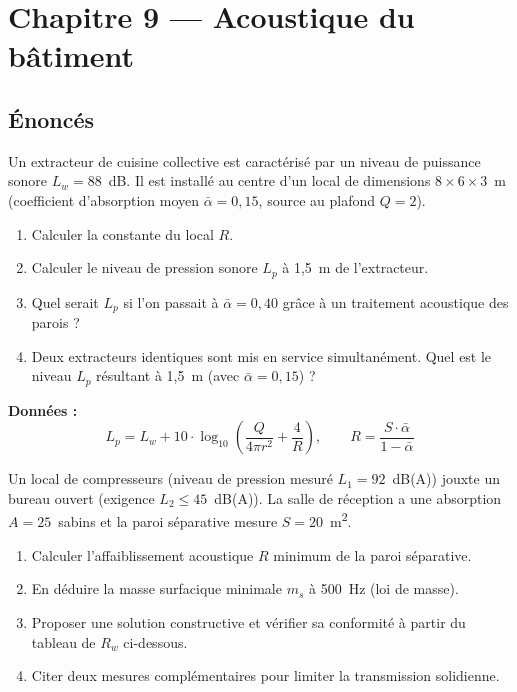 \chapter*{Chapitre 9 — Acoustique du bâtiment}

\section*{Énoncés}


Un extracteur de cuisine collective est caractérisé par un niveau de puissance sonore $L_w = 88$~dB. Il est installé au centre d'un local de dimensions $8 \times 6 \times 3$~m (coefficient d'absorption moyen $\bar{\alpha} = 0{,}15$, source au plafond $Q = 2$).

\begin{enumerate}
  \item Calculer la constante du local $R$.
  \item Calculer le niveau de pression sonore $L_p$ à 1,5~m de l'extracteur.
  \item Quel serait $L_p$ si l'on passait à $\bar{\alpha} = 0{,}40$ grâce à un traitement acoustique des parois ?
  \item Deux extracteurs identiques sont mis en service simultanément. Quel est le niveau $L_p$ résultant à 1,5~m (avec $\bar{\alpha} = 0{,}15$) ?
\end{enumerate}

\textbf{Données :}
\[
  L_p = L_w + 10 \cdot \log_{10}\!\left(\frac{Q}{4\pi r^2} + \frac{4}{R}\right), \qquad R = \frac{S \cdot \bar{\alpha}}{1 - \bar{\alpha}}
\]


Un local de compresseurs (niveau de pression mesuré $L_1 = 92$~dB(A)) jouxte un bureau ouvert (exigence $L_2 \leq 45$~dB(A)). La salle de réception a une absorption $A = 25$~sabins et la paroi séparative mesure $S = 20$~\si{\metre\squared}.

\begin{enumerate}
  \item Calculer l'affaiblissement acoustique $R$ minimum de la paroi séparative.
  \item En déduire la masse surfacique minimale $m_s$ à 500~Hz (loi de masse).
  \item Proposer une solution constructive et vérifier sa conformité à partir du tableau de $R_w$ ci-dessous.
  \item Citer deux mesures complémentaires pour limiter la transmission solidienne.
\end{enumerate}

